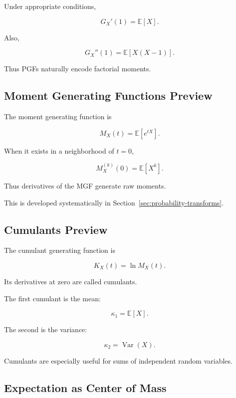 Under appropriate conditions,

\[
\boxed{
G_X'(1)
=
\mathbb{E}[X].
}
\]

Also,

\[
\boxed{
G_X''(1)
=
\mathbb{E}[X(X-1)].
}
\]

Thus PGFs naturally encode factorial moments.

\subsection{Moment Generating Functions Preview}
\label{subsec:mgf-preview-expectation}

The moment generating function is

\[
\boxed{
M_X(t)
=
\mathbb{E}[e^{tX}].
}
\]

When it exists in a neighborhood of \(t=0\),

\[
\boxed{
M_X^{(k)}(0)
=
\mathbb{E}[X^k].
}
\]

Thus derivatives of the MGF generate raw moments.

This is developed systematically in Section~\ref{sec:probability-transforms}.

\subsection{Cumulants Preview}
\label{subsec:cumulants-preview}

The cumulant generating function is

\[
\boxed{
K_X(t)
=
\ln M_X(t).
}
\]

Its derivatives at zero are called cumulants.

The first cumulant is the mean:

\[
\boxed{
\kappa_1
=
\mathbb{E}[X].
}
\]

The second is the variance:

\[
\boxed{
\kappa_2
=
\operatorname{Var}(X).
}
\]

Cumulants are especially useful for sums of independent random
variables.

\subsection{Expectation as Center of Mass}
\label{subsec:expectation-center-mass}


